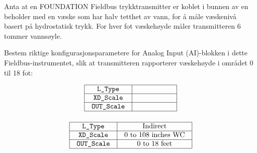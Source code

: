 

Anta at en FOUNDATION Fieldbus trykktransmitter er koblet i bunnen av en beholder med en væske som har halv tetthet av vann, for å måle væskenivå basert på hydrostatisk trykk. For hver fot væskehøyde måler transmitteren 6 tommer vannsøyle.

\vskip 10pt

Bestem riktige konfigurasjonsparametere for Analog Input (AI)-blokken i dette Fieldbus-instrumentet, slik at transmitteren rapporterer væskehøyde i området 0 til 18 fot:


$$\vbox{\offinterlineskip
\halign{\strut
\vrule \quad\hfil # \ \hfil & 
\vrule \quad\hfil # \ \hfil \vrule \cr
\noalign{\hrule}
%
{\tt L\_Type} & \hskip 50pt \cr
%
\noalign{\hrule}
%
{\tt XD\_Scale} & \hskip 50pt \cr
%
\noalign{\hrule}
%
{\tt OUT\_Scale} & \hskip 50pt \cr
%
\noalign{\hrule}
} %
}$$ %








$$\vbox{\offinterlineskip
\halign{\strut
\vrule \quad\hfil # \ \hfil & 
\vrule \quad\hfil # \ \hfil \vrule \cr
\noalign{\hrule}
%
{\tt L\_Type} & Indirect \cr
%
\noalign{\hrule}
%
{\tt XD\_Scale} & 0 to 108 inches WC \cr
%
\noalign{\hrule}
%
{\tt OUT\_Scale} & 0 to 18 feet \cr
%
\noalign{\hrule}
} %
}$$ %











